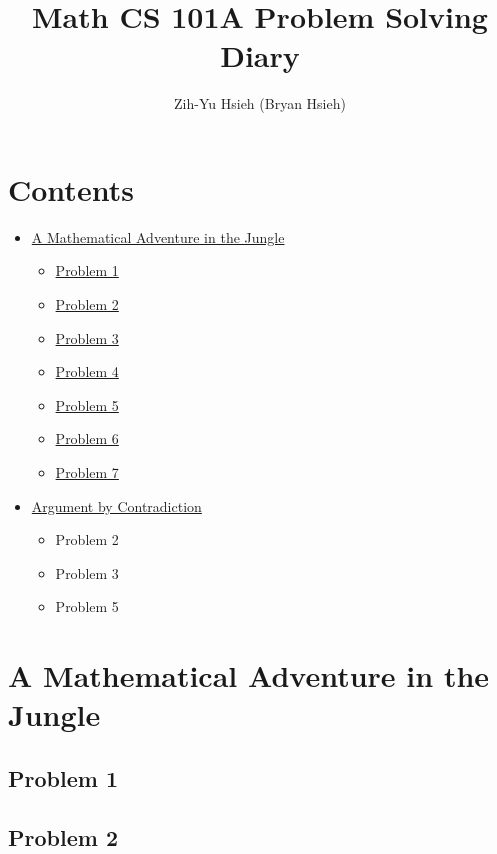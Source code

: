 \documentclass{article}
\title{Math CS 101A Problem Solving Diary}
\author{Zih-Yu Hsieh (Bryan Hsieh)}
\begin{document}
\maketitle

\section*{Contents}
\begin{itemize}
    \item \hyperlink{section.1}{A Mathematical Adventure in the Jungle}
    \begin{itemize}
        \item{} \hyperlink{subsection.1.1}{Problem 1}
        \item{} \hyperlink{subsection.1.2}{Problem 2}
        \item{} \hyperlink{subsection.1.3}{Problem 3}
        \item{} \hyperlink{subsection.1.4}{Problem 4}
        \item{} \hyperlink{subsection.1.5}{Problem 5}
        \item{} \hyperlink{subsection.1.6}{Problem 6}
        \item{} \hyperlink{subsection.1.7}{Problem 7}
    \end{itemize}
    \item \hyperlink{section.2}{Argument by Contradiction}
    \begin{itemize}
        \item{} Problem 2
        \item{} Problem 3
        \item{} Problem 5
    \end{itemize}
\end{itemize}

\break

\section{A Mathematical Adventure in the Jungle}
\subsection{Problem 1}

\hfill

\subsection{Problem 2}

\hfill
\end{document}
